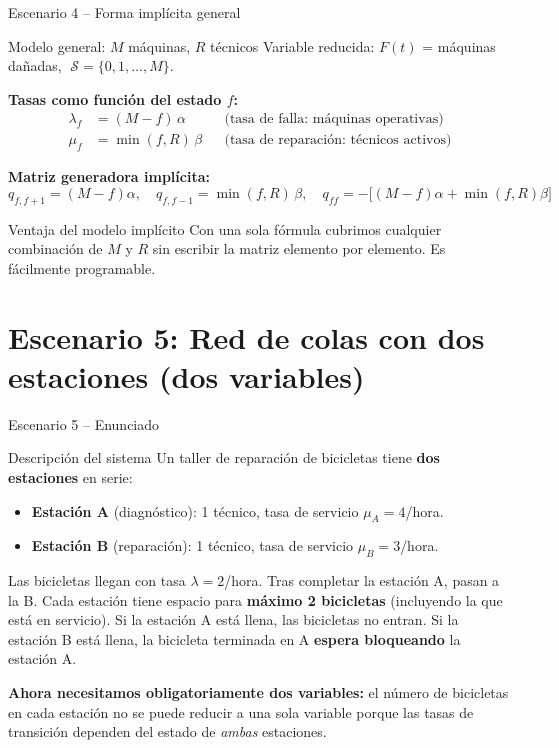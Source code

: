 \documentclass[aspectratio=1610, 9pt]{beamer}
\begin{document}
\begin{frame}{Escenario 4 -- Forma impl\'icita general}
\begin{block}{Modelo general: $M$ m\'aquinas, $R$ t\'ecnicos}
Variable reducida: $F(t)$ = m\'aquinas da\~nadas, $\;\mathcal{S} = \{0,1,\ldots,M\}$.
\end{block}

\textbf{Tasas como funci\'on del estado $f$:}
\begin{align*}
\lambda_f &= (M - f)\,\alpha & &\text{(tasa de falla: m\'aquinas operativas)} \\
\mu_f &= \min(f, R)\,\beta & &\text{(tasa de reparaci\'on: t\'ecnicos activos)}
\end{align*}

\textbf{Matriz generadora impl\'icita:}
\[
\boxed{
q_{f,f+1} = (M-f)\alpha, \quad q_{f,f-1} = \min(f,R)\,\beta, \quad q_{ff} = -\big[(M-f)\alpha + \min(f,R)\beta\big]
}
\]

\vspace{4pt}
\begin{alertblock}{Ventaja del modelo implícito}
Con una sola f\'ormula cubrimos cualquier combinaci\'on de $M$ y $R$ sin escribir la matriz elemento por elemento. Es f\'acilmente programable.
\end{alertblock}
\end{frame}

\section{Escenario 5: Red de colas con dos estaciones (dos variables)}

\begin{frame}{Escenario 5 -- Enunciado}
\begin{exampleblock}{Descripción del sistema}
Un taller de reparaci\'on de bicicletas tiene \textbf{dos estaciones} en serie:
\begin{itemize}
    \item \textbf{Estaci\'on A} (diagn\'ostico): 1 t\'ecnico, tasa de servicio $\mu_A = 4$/hora.
    \item \textbf{Estaci\'on B} (reparaci\'on): 1 t\'ecnico, tasa de servicio $\mu_B = 3$/hora.
\end{itemize}
Las bicicletas llegan con tasa $\lambda = 2$/hora. Tras completar la estaci\'on A, pasan a la B. Cada estaci\'on tiene espacio para \textbf{m\'aximo 2 bicicletas} (incluyendo la que est\'a en servicio). Si la estaci\'on A est\'a llena, las bicicletas no entran. Si la estaci\'on B est\'a llena, la bicicleta terminada en A \textbf{espera bloqueando} la estaci\'on A.
\end{exampleblock}

\vspace{4pt}
\textbf{Ahora necesitamos obligatoriamente dos variables:} el n\'umero de bicicletas en cada estaci\'on no se puede reducir a una sola variable porque las tasas de transici\'on dependen del estado de \textit{ambas} estaciones.
\end{frame}
\end{document}
